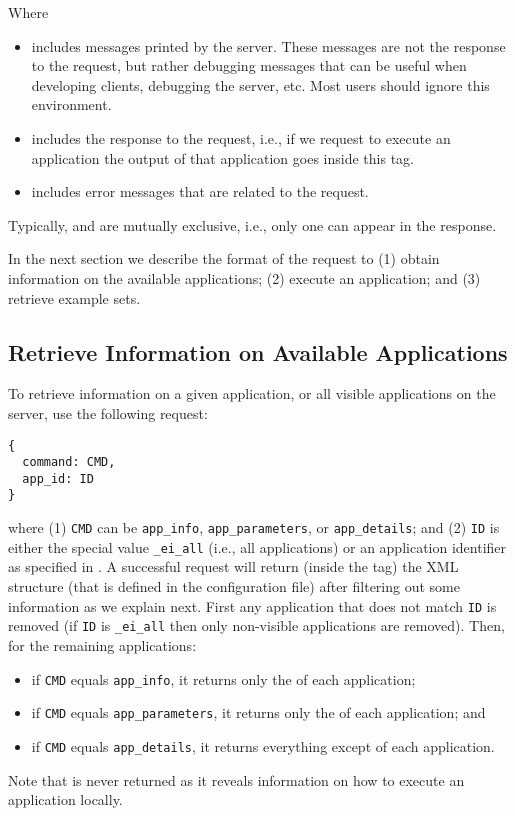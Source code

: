 \bigskip
\noindent
Where
%
\begin{itemize}
%
\item {} includes messages printed by the
  server. These messages are not the response to the request, but
  rather debugging messages that can be useful when developing
  clients, debugging the server, etc. Most users should ignore this
  environment.
%
\item {} includes the response to the request, i.e., if
  we request to execute an application the output of that application
  goes inside this tag.
%
\item {} includes error messages that are related to the
  request.
%
\end{itemize}
%
Typically,  and  are mutually exclusive,
i.e., only one can appear in the response. 

\bigskip 
%
In the next section we describe the format of the request to (1)
obtain information on the available applications; (2) execute an
application; and (3) retrieve example sets.

\subsection{Retrieve Information on Available Applications}

To retrieve information on a given application, or all visible
applications on the server, use the following request:

\bigskip
\begin{lstlisting}
{
  command: CMD,
  app_id: ID
}
\end{lstlisting}

\bigskip
\noindent
where (1) \texttt{CMD} can be \texttt{app\_info},
\texttt{app\_parameters}, or \texttt{app\_details}; and (2)
\texttt{ID} is either the special value \texttt{\_ei\_all} (i.e., all
applications) or an application identifier as specified in
.
%
A successful request will return (inside the  tag) the
XML structure  (that is defined in the
configuration file) after filtering out some information as we explain
next.
%
First any application that does not match \texttt{ID} is removed (if
\texttt{ID} is \texttt{\_ei\_all} then only non-visible applications
are removed). Then, for the remaining applications:
%
\begin{itemize}
%
\item if \texttt{CMD} equals \texttt{app\_info}, it returns only the
   of each application;
%
\item if \texttt{CMD} equals \texttt{app\_parameters}, it returns only the
   of each application; and
%
\item if \texttt{CMD} equals \texttt{app\_details}, it returns
  everything except  of each
  application.
%
\end{itemize}
%
Note that  is never returned as it
reveals information on how to execute an application locally.




